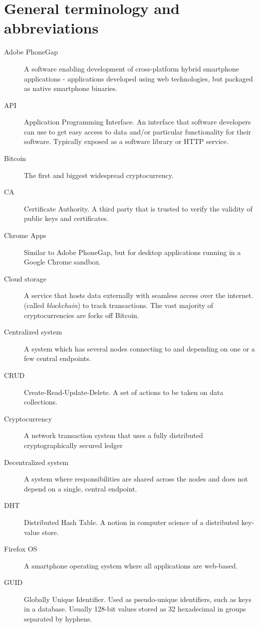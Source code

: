 \section*{General terminology and abbreviations}

\begin{description}
  \item[Adobe PhoneGap] A software enabling development of cross-platform hybrid smartphone applications - applications developed using web technologies, but packaged as native smartphone binaries.
  \item[API] Application Programming Interface. An interface that software developers can use to get easy access to data and/or particular functionality for their software. Typically exposed as a software library or HTTP service.
  \item[Bitcoin] The first and biggest widespread cryptocurrency.
  \item[CA] Certificate Authority. A third party that is trusted to verify the validity of public keys and certificates.
  \item[Chrome Apps] Similar to Adobe PhoneGap, but for desktop applications running in a Google Chrome sandbox.
  \item[Cloud storage] A service that hosts data externally with seamless access over the internet.
   (called \emph{blockchain}) to track transactions. The vast majority of cryptocurrencies are forks off Bitcoin.
  \item[Centralized system] A system which has several nodes connecting to and depending on one or a few central endpoints.
  \item[CRUD] Create-Read-Update-Delete. A set of actions to be taken on data collections.
  \item[Cryptocurrency] A network transaction system that uses a fully distributed cryptographically secured ledger
  \item[Decentralized system] A system where responsibilities are shared across the nodes and does not depend on a single, central endpoint.
  \item[DHT] Distributed Hash Table. A notion in computer science of a distributed key-value store.
  \item[Firefox OS] A smartphone operating system where all applications are web-based.
  \item[GUID] Globally Unique Identifier. Used as pseudo-unique identifiers, such as keys in a database. Usually 128-bit values stored as 32 hexadecimal in groups separated by hyphens.

\end{description}
